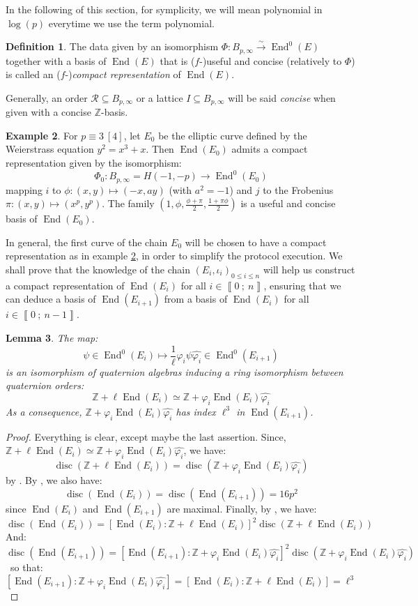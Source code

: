 \documentclass[a4paper,10pt]{report}
\theoremstyle{definition}
\newtheorem{definition}{Definition}[chapter]
\theoremstyle{plain}
\newtheorem{lemma}[definition]{Lemma}
\theoremstyle{definition}
\newtheorem{example}[definition]{Example}
\newcommand{\Z}{\mathbb{Z}}
\newcommand{\m}[1]{\mathcal{#1}}
\renewcommand{\i}[2]{\left\llbracket #1~;~#2\right\rrbracket}
\renewcommand{\(}{\left(}
\renewcommand{\)}{\right)}
\DeclareMathOperator{\End}{End}
\DeclareMathOperator{\disc}{disc}
\begin{document}
In the following of this section, for symplicity, we will mean polynomial in $\log(p)$ everytime we use the term polynomial.

\begin{definition}\label{definition 3}
The data given by an isomorphism $\Phi : B_{p,\infty} \overset{\sim}{\longrightarrow}\End^0(E)$ together with a basis of $\End(E)$ that is ($f$-)useful and concise (relatively to $\Phi$) is called an ($f$-)\emph{compact representation} of $\End(E)$.

Generally, an order $\m{R}\subseteq B_{p,\infty}$ or a lattice $I\subseteq B_{p,\infty}$ will be said \emph{concise} when given with a concise $\Z$-basis.
\end{definition}

\begin{example}\label{example 2}
For $p\equiv 3 \ [4]$, let $E_0$ be the elliptic curve defined by the Weierstrass equation $y^2=x^3+x$. Then $\End(E_0)$ admits a compact representation given by the isomorphism: 
\[\Phi_0 : B_{p,\infty}=H(-1,-p) \longrightarrow\End^0(E_0)\] 
mapping $i$ to $\phi : (x,y)\longmapsto (-x,ay)$ (with $a^2=-1$) and $j$ to the Frobenius $\pi : (x,y)\longmapsto (x^p,y^p)$. The family $\(1, \phi,\frac{\phi+\pi}{2},\frac{1+\pi\phi}{2}\)$ is a useful and concise basis of $\End(E_0)$.
\end{example}

In general, the first curve of the chain $E_0$ will be chosen to have a compact representation as in example \ref{example 2}, in order to simplify the protocol execution. We shall prove that the knowledge of the chain $(E_i,\iota_i)_{0\leq i\leq n}$ will help us construct a compact representation of $\End(E_i)$ for all $i\in\i{0}{n}$, ensuring that we can deduce a basis of $\End(E_{i+1})$ from a basis of $\End(E_i)$ for all $i\in\i{0}{n-1}$.

\begin{lemma}\label{lemma 3}
The map:
\[\psi\in\End^0(E_i)\longmapsto \frac{1}{\ell}\varphi_i\psi\widehat{\varphi_i}\in \End^0(E_{i+1})\]
is an isomorphism of quaternion algebras inducing a ring isomorphism between quaternion orders:
\[\Z+\ell\End(E_i)\simeq \Z+\varphi_i\End(E_i)\widehat{\varphi_i}\]
As a consequence, $\Z+\varphi_i\End(E_i)\widehat{\varphi_i}$ has index $\ell^3$ in $\End(E_{i+1})$.
\end{lemma}

\begin{proof}
Everything is clear, except maybe the last assertion.  Since, $\Z+\ell\End(E_i)\simeq \Z+\varphi_i\End(E_i)\widehat{\varphi_i}$, we have:
\[\disc(\Z+\ell\End(E_i))=\disc(\Z+\varphi_i\End(E_i)\widehat{\varphi_i})\]
by \cite[corollary 15.2.9]{Voight}. By \cite[theorem 15.5.5]{Voight}, we also have:
\[\disc(\End(E_i))=\disc(\End(E_{i+1}))=16p^2\]
since $\End(E_i)$ and $\End(E_{i+1})$ are maximal. Finally, by \cite[lemma 15.2.15]{Voight}, we have:
\[\disc(\End(E_i))=[\End(E_i):\Z+\ell\End(E_i)]^2\disc(\Z+\ell\End(E_i))\]
And:
\[\disc(\End(E_{i+1}))=[\End(E_{i+1}):\Z+\varphi_i\End(E_i)\widehat{\varphi_i}]^2\disc(\Z+\varphi_i\End(E_i)\widehat{\varphi_i})\]\
so that:
\[[\End(E_{i+1}):\Z+\varphi_i\End(E_i)\widehat{\varphi_i}]=[\End(E_i):\Z+\ell\End(E_i)]=\ell^3\]
\end{proof}
\end{document}
